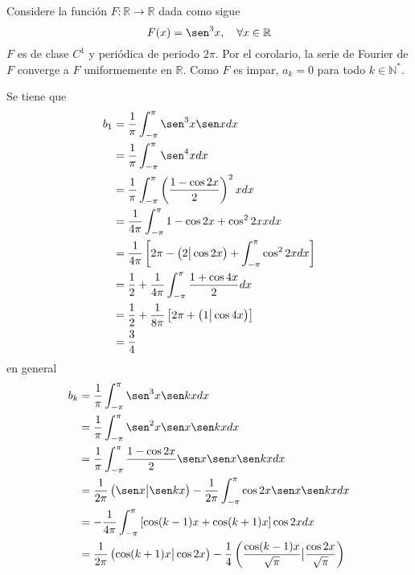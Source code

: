 \documentclass[12pt]{report}
\theoremstyle{largebreak}
\newcommand\cf[3]{\ensuremath{#1:#2\rightarrow#3}}
\newcommand\pint[2]{\ensuremath{\left(#1\big| #2\right)}}
\begin{document}
    \begin{exa}
        Considere la función $\cf{F}{\mathbb{R}}{\mathbb{R}}$ dada como sigue
        \begin{equation*}
             F(x)=\sen^3 x,\quad\forall x\in\mathbb{R}
        \end{equation*}
        $F$ es de clase $C^1$ y periódica de periodo $2\pi$. Por el corolario, la serie de Fourier de $F$ converge a $F$ uniformemente en $\mathbb{R}$. Como $F$ es impar, $a_k=0$ para todo $k\in\mathbb{N}^*$.

        Se tiene que
        \begin{equation*}
            \begin{split}
                b_1&=\frac{1}{\pi}\int_{ -\pi}^\pi \sen^3 x\sen xdx\\
                &=\frac{1}{\pi}\int_{ -\pi}^\pi \sen^4 xdx\\
                &=\frac{1}{\pi}\int_{ -\pi}^\pi \left(\frac{1-\cos 2x}{2} \right)^2 xdx\\
                &=\frac{1}{4\pi}\int_{ -\pi}^\pi 1-\cos 2x+\cos^2 2x xdx\\
                &=\frac{1}{4\pi}\left[2\pi-\pint{2}{\cos 2x}+\int_{ -\pi}^\pi\cos^2 2xdx \right] \\
                &=\frac{1}{2}+\frac{1}{4\pi}\int_{ -\pi}^\pi\frac{1+\cos 4x}{2}dx\\
                &=\frac{1}{2}+\frac{1}{8\pi}\left[2\pi+\pint{1}{\cos 4x} \right] \\
                &=\frac{3}{4}\\
            \end{split}
        \end{equation*}
        en general
        \begin{equation*}
            \begin{split}
                b_k&=\frac{1}{\pi}\int_{-\pi}^\pi\sen^3x\sen kxdx\\
                &=\frac{1}{\pi}\int_{-\pi}^\pi\sen^2x\sen x \sen kxdx\\
                &=\frac{1}{\pi}\int_{-\pi}^\pi\frac{1-\cos 2x}{2}\sen x\sen x \sen kxdx\\
                &=\frac{1}{2\pi}\pint{\sen x}{\sen kx}-\frac{1}{2\pi}\int_{-\pi}^\pi\cos2x\sen x\sen kxdx\\
                &=-\frac{1}{4\pi}\int_{-\pi}^\pi\left[\cos(k-1)x+\cos(k+1)x \right]\cos 2xdx \\
                &=\frac{1}{2\pi}\pint{\cos (k+1)x}{\cos 2x}-\frac{1}{4}\pint{\frac{\cos (k-1)x}{\sqrt{\pi}}}{\frac{\cos 2x}{\sqrt{\pi}}}\\

\end{split}
\end{equation*}
\end{exa}
\end{document}
